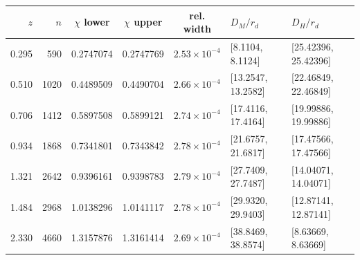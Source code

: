 \begin{tabular}{@{}rrcccll@{}}\toprule
$z$ & $n$ & $\chi$ lower & $\chi$ upper & rel. width & $D_M/r_d$ & $D_H/r_d$ \\
\midrule
0.295 & 590 & 0.2747074 & 0.2747769 & $2.53\times10^{-4}$ & [8.1104, 8.1124] & [25.42396, 25.42396] \\
0.510 & 1020 & 0.4489509 & 0.4490704 & $2.66\times10^{-4}$ & [13.2547, 13.2582] & [22.46849, 22.46849] \\
0.706 & 1412 & 0.5897508 & 0.5899121 & $2.74\times10^{-4}$ & [17.4116, 17.4164] & [19.99886, 19.99886] \\
0.934 & 1868 & 0.7341801 & 0.7343842 & $2.78\times10^{-4}$ & [21.6757, 21.6817] & [17.47566, 17.47566] \\
1.321 & 2642 & 0.9396161 & 0.9398783 & $2.79\times10^{-4}$ & [27.7409, 27.7487] & [14.04071, 14.04071] \\
1.484 & 2968 & 1.0138296 & 1.0141117 & $2.78\times10^{-4}$ & [29.9320, 29.9403] & [12.87141, 12.87141] \\
2.330 & 4660 & 1.3157876 & 1.3161414 & $2.69\times10^{-4}$ & [38.8469, 38.8574] & [8.63669, 8.63669] \\
\bottomrule
\end{tabular}
